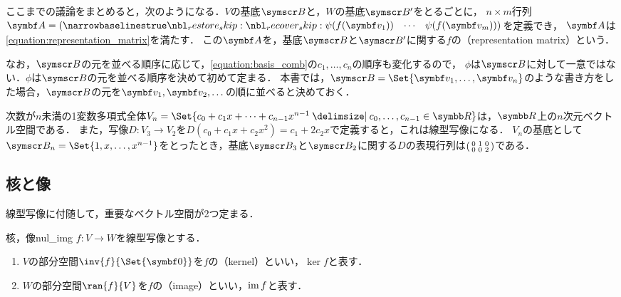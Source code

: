 \documentclass[../../main]{subfiles}
\begin{document}
ここまでの議論をまとめると，次のようになる．\(V\)の基底\(\basis{B}\)と，\(W\)の基底\(\basis{B}'\)をとるごとに，
\(n\times m\)行列\(\mat{A}=\rowvect{\psi(f(\vect{v}_1)) & \cdots & \psi(f(\vect{v}_m))}\)を定義でき，
\(\mat{A}\)は\cref{equation:representation_matrix}を満たす．
この\(\mat{A}\)を，基底\(\basis{B}\)と\(\basis{B}'\)に関する\(f\)の（representation matrix）という．

なお，\(\basis{B}\)の元を並べる順序に応じて，\cref{equation:basis_comb}の\(c_1,\dots,c_n\)の順序も変化するので，
\(\phi\)は\(\basis{B}\)に対して一意ではない．\(\phi\)は\(\basis{B}\)の元を並べる順序を決めて初めて定まる．
本書では，\(\basis{B}=\Set{\vect{v}_1,\dots,\vect{v}_n}\)のような書き方をした場合，\(\basis{B}\)の元を\(\vect{v}_1,\vect{v}_2,\dotsc\)の順に並べると決めておく．

\begin{example}[形式的な微分]
  次数が\(n\)未満の1変数多項式全体\(V_n=\Set{c_0+c_1x+\dots+c_{n-1}x^{n-1}\given c_0,\dots,c_{n-1}\in\numset{R}}\)は，\(\numset{R}\)上の\(n\)次元ベクトル空間である．
  また，写像\(D\colon V_3\to V_2\)を\(D(c_0+c_1x+c_2x^2)=c_1+2c_2x\)で定義すると，これは線型写像になる．
  \(V_n\)の基底として\(\basis{B}_n=\Set{1,x,\dots,x^{n-1}}\)をとったとき，基底\(\basis{B}_3\)と\(\basis{B}_2\)に関する\(D\)の表現行列は\(\begin{psmallmatrix}0 & 1 & 0 \\ 0 & 0 & 2\end{psmallmatrix}\)である．
\end{example}

\subsection{核と像}

線型写像に付随して，重要なベクトル空間が2つ定まる．

\begin{definition}{核，像}{nul_img}
  \(f\colon V\to W\)を線型写像とする．
  \begin{enumerate}
    \item \(V\)の部分空間\(\inv{f}{\Set{\vect{0}}}\)を\(f\)の（kernel）といい，\(\ker f\)と表す．
    \item \(W\)の部分空間\(\ran{f}{V}\)を\(f\)の（image）といい，\(\operatorname{im} f\)と表す．
  \end{enumerate}
\end{definition}
\end{document}
